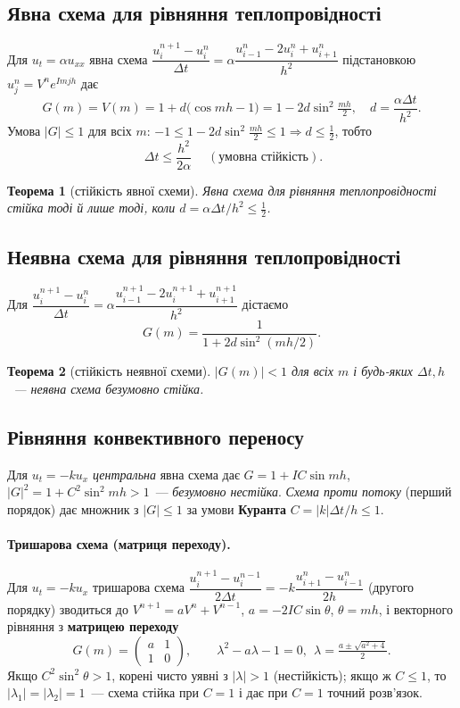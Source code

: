 \documentclass[12pt,a4paper]{article}
\theoremstyle{definition}
\theoremstyle{plain}
\newtheorem*{teorema*}{Теорема}
\newcommand{\abs}[1]{\left\lvert #1 \right\rvert}
\begin{document}
\subsection{Явна схема для рівняння теплопровідності}
Для $u_t=\alpha u_{xx}$ явна схема
$\dfrac{u_i^{n+1}-u_i^n}{\Delta t}=\alpha\dfrac{u_{i-1}^n-2u_i^n+u_{i+1}^n}{h^2}$
підстановкою $u^n_j=V^n e^{Imjh}$ дає
\begin{equation}
  G(m)=V(m)=1+d\big(\cos mh-1\big)=1-2d\sin^2\tfrac{mh}{2},\quad d=\frac{\alpha\Delta t}{h^2}.
\end{equation}
Умова $\abs{G}\le1$ для всіх $m$:\;
$-1\le1-2d\sin^2\tfrac{mh}{2}\le1\Rightarrow d\le\tfrac12$, тобто
\begin{equation}
  \boxed{\;\Delta t\le\frac{h^2}{2\alpha}\;}\quad(\text{умовна стійкість}).
\end{equation}

\begin{teorema*}[стійкість явної схеми]
Явна схема для рівняння теплопровідності стійка тоді й лише тоді, коли
$d=\alpha\Delta t/h^2\le\tfrac12$.
\end{teorema*}

\subsection{Неявна схема для рівняння теплопровідності}
Для
$\dfrac{u_i^{n+1}-u_i^n}{\Delta t}=\alpha\dfrac{u_{i-1}^{n+1}-2u_i^{n+1}+u_{i+1}^{n+1}}{h^2}$
дістаємо
\begin{equation}
  G(m)=\frac{1}{1+2d\sin^2(mh/2)} .
\end{equation}
\begin{teorema*}[стійкість неявної схеми]
$\abs{G(m)}<1$ для всіх $m$ і будь-яких $\Delta t,h$~--- неявна схема
\emph{безумовно стійка}.
\end{teorema*}

\subsection{Рівняння конвективного переносу}
Для $u_t=-k u_x$ \emph{центральна} явна схема дає
$G=1+IC\sin mh$, $\abs{G}^2=1+C^2\sin^2 mh>1$~--- \emph{безумовно
нестійка}. \emph{Схема проти потоку} (перший порядок) дає множник з
$\abs{G}\le1$ за умови \textbf{Куранта} $C=\abs{k}\Delta t/h\le1$.

\paragraph{Тришарова схема (матриця переходу).} Для $u_t=-k u_x$
тришарова схема
$\dfrac{u_i^{n+1}-u_i^{n-1}}{2\Delta t}=-k\dfrac{u_{i+1}^n-u_{i-1}^n}{2h}$
(другого порядку) зводиться до
$V^{n+1}=aV^n+V^{n-1}$, $a=-2IC\sin\theta$, $\theta=mh$, і векторного
рівняння з \textbf{матрицею переходу}
\[
  G(m)=\begin{pmatrix} a & 1\\ 1 & 0\end{pmatrix},\qquad
  \lambda^2-a\lambda-1=0,\ \ \lambda=\tfrac{a\pm\sqrt{a^2+4}}{2}.
\]
Якщо $C^2\sin^2\theta>1$, корені чисто уявні з $\abs{\lambda}>1$
(нестійкість); якщо ж $C\le1$, то $\abs{\lambda_1}=\abs{\lambda_2}=1$~---
схема стійка при $C=1$ і дає при $C=1$ точний розв'язок.
\end{document}
